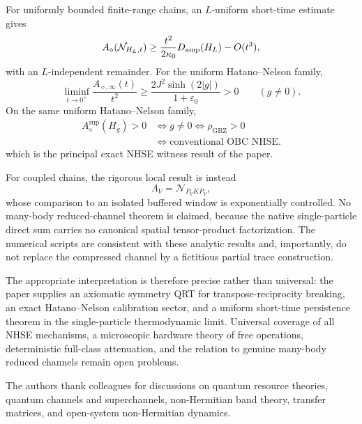 \documentclass[reprint,amsmath,amssymb,aps,nofootinbib]{revtex4-2}
\newcommand{\GBZ}{\mathrm{GBZ}}
\newcommand{\Damp}{D_{\rm amp}}
\begin{document}
For uniformly bounded finite-range chains, an $L$-uniform short-time estimate gives
\begin{equation}
A_\diamond(\mathcal N_{H_L,t})
\ge
\frac{t^2}{2\kappa_0}\Damp(H_L)-O(t^3),
\end{equation}
with an $L$-independent remainder. For the uniform Hatano--Nelson family,
\begin{equation}
\liminf_{t\to0^+}
\frac{A_{\diamond,\infty}(t)}{t^2}
\ge
\frac{2J^2\sinh(2|g|)}{1+\varepsilon_0}>0
\qquad(g\ne0).
\end{equation}
On the same uniform Hatano--Nelson family,
\begin{equation}
\boxed{\begin{aligned}
A_\diamond^{\sup}(H_g)>0
&\iff g\ne0\iff \rho_{\GBZ}>0\\
&\iff \text{conventional OBC NHSE}.
\end{aligned}}
\end{equation}
which is the principal exact NHSE witness result of the paper.

For coupled chains, the rigorous local result is instead
\begin{equation}
\Lambda_V=\mathcal N_{P_VKP_V},
\end{equation}
whose comparison to an isolated buffered window is exponentially controlled. No many-body
reduced-channel theorem is claimed, because the native single-particle direct sum carries no
canonical spatial tensor-product factorization. The numerical scripts are consistent with these
analytic results and, importantly, do not replace the compressed channel by a fictitious partial
trace construction.

The appropriate interpretation is therefore precise rather than universal: the paper supplies an
axiomatic symmetry QRT for transpose-reciprocity breaking, an exact Hatano--Nelson calibration sector,
and a uniform short-time persistence theorem in the single-particle thermodynamic limit. Universal coverage of all NHSE mechanisms, a microscopic
hardware theory of free operations, deterministic full-class attenuation, and the relation to
genuine many-body reduced channels remain open problems.

\begin{acknowledgments}
The authors thank colleagues for discussions on quantum resource theories, quantum channels and
superchannels, non-Hermitian band theory, transfer matrices, and open-system non-Hermitian dynamics.
\end{acknowledgments}
\end{document}
